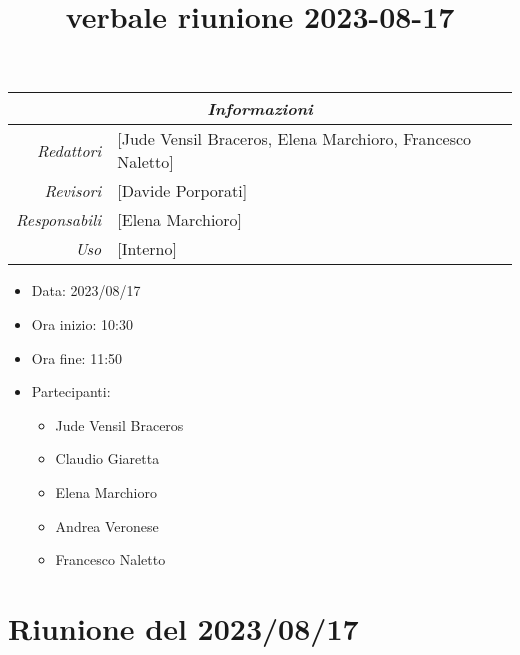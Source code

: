 \documentclass[12pt]{article}
\begin{document}
\graphicspath{ {../../templates/img} }

\title{verbale riunione 2023-08-17}

\firstPage
\maketitle

\begin{center}
\begin{tabular}{r | l}
    \multicolumn{2}{c}{\textit{Informazioni}}\\
    \hline
    
        \textit{Redattori} &
        [Jude Vensil Braceros, Elena Marchioro, Francesco Naletto]\makecell{}\\
    
        \textit{Revisori} &
        [Davide Porporati]\makecell{}\\
        \textit{Responsabili} &
        [Elena Marchioro]\makecell{}\\
            \textit{Uso} & 
            [Interno]\makecell{}\\
\end{tabular}
    \begin{itemize}
    \item[] Data: 2023/08/17
    \item[] Ora inizio: 10:30
    \item[] Ora fine: 11:50
    \item[] Partecipanti:
    \begin{itemize}
    \item[] Jude Vensil Braceros
    \item[] Claudio Giaretta
    \item[] Elena Marchioro
    \item[] Andrea Veronese
    \item[] Francesco Naletto
    \end{itemize}
\end{itemize}
\end{center}


\tableofcontents
\printindex 
\section{Riunione del 2023/08/17}
\end{document}
